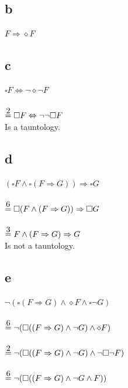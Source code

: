 \documentclass[12pt]{article}
\newcommand\parttwo{\stackrel{\mathclap{\normalfont\mbox{2}}}{=}}
\newcommand\partthree{\stackrel{\mathclap{\normalfont\mbox{3}}}{=}}
\newcommand\partsix{\stackrel{\mathclap{\normalfont\mbox{6}}}{=}}
\begin{document}
\subsection*{b}
$F \Rightarrow \diamond F$\\

\subsection*{c}
$\square F \Leftrightarrow \lnot \diamond \lnot F$\\\\
$\parttwo \square F \Leftrightarrow \lnot \lnot \square F $\\
Is a tauntology.

\subsection*{d}
$(\square F \land \square (F \Rightarrow G)) \Rightarrow \square G$\\\\
$\partsix \square (F \land (F \Rightarrow G)) \Rightarrow \square G$\\\\
$\partthree F \land (F \Rightarrow G) \Rightarrow G$\\
Is not a tauntology.

\subsection*{e}
$\lnot (\square (F \Rightarrow G) \land \diamond F \land \square \lnot G)$\\\\
$\partsix \lnot (\square ((F \Rightarrow G) \land \lnot G) \land \diamond F)$\\\\
$\parttwo \lnot (\square ((F \Rightarrow G) \land \lnot G) \land \lnot \square \lnot F)$\\\\
$\partsix \lnot (\square ((F \Rightarrow G) \land \lnot G \land F))$

\end{document}
